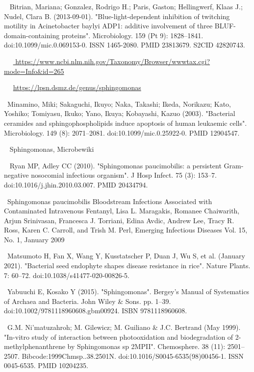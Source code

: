 \documentclass[11pt]{article}
\begin{document}
\begin{thebibliography}{3}
	~  Bitrian, Mariana; Gonzalez, Rodrigo H.; Paris, Gaston; Hellingwerf, Klaas J.; Nudel, Clara B. (2013-09-01). "Blue-light-dependent inhibition of twitching motility in Acinetobacter baylyi ADP1: additive involvement of three BLUF-domain-containing proteins". Microbiology. 159 (Pt 9): 1828–1841. doi:10.1099/mic.0.069153-0. ISSN 1465-2080. PMID 23813679. S2CID 42820743.		

	~ ~\url{
https://www.ncbi.nlm.nih.gov/Taxonomy/Browser/wwwtax.cgi?mode=Info\&id=265}

	~ ~\url{https://lpsn.dsmz.de/genus/sphingomonas}

 	~Minamino, Miki; Sakaguchi, Ikuyo; Naka, Takashi; Ikeda, Norikazu; Kato, Yoshiko; Tomiyasu, Ikuko; Yano, Ikuya; Kobayashi, Kazuo (2003). "Bacterial ceramides and sphingophospholipids induce apoptosis of human leukaemic cells". Microbiology. 149 (8): 2071–2081. doi:10.1099/mic.0.25922-0. PMID 12904547.
 
	~ Sphingomonas, Microbewiki
	
	~ Ryan MP, Adley CC (2010). "Sphingomonas paucimobilis: a persistent Gram-negative nosocomial infectious organism". J Hosp Infect. 75 (3): 153–7. doi:10.1016/j.jhin.2010.03.007. PMID 20434794.

	~Sphingomonas paucimobilis Bloodstream Infections Associated with Contaminated Intravenous Fentanyl, Lisa L. Maragakis, Romanee Chaiwarith, Arjun Srinivasan, Francesca J. Torriani, Edina Avdic, Andrew Lee, Tracy R. Ross, Karen C. Carroll, and Trish M. Perl, Emerging Infectious Diseases Vol. 15, No. 1, January 2009

	~Matsumoto H, Fan X, Wang Y, Kusstatscher P, Duan J, Wu S, et al. (January 2021). "Bacterial seed endophyte shapes disease resistance in rice". Nature Plants. 7: 60–72. doi:10.1038/s41477-020-00826-5.

	~Yabuuchi E, Kosako Y (2015). "Sphingomonas". Bergey's Manual of Systematics of Archaea and Bacteria. John Wiley \& Sons. pp. 1–39. doi:10.1002/9781118960608.gbm00924. ISBN 9781118960608.

	~G.M. Ni'matuzahroh; M. Gilewicz; M. Guiliano \& J.C. Bertrand (May 1999). "In-vitro study of interaction between photooxidation and biodegradation of 2-methylphenanthrene by Sphingomonas sp 2MPII". Chemosphere. 38 (11): 2501–2507. Bibcode:1999Chmsp..38.2501N. doi:10.1016/S0045-6535(98)00456-1. ISSN 0045-6535. PMID 10204235.


\end{thebibliography}
\end{document}
